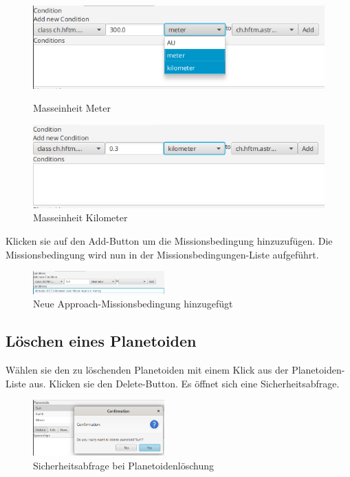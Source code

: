 \begin{figure}[H]
	\centering
	\begin{minipage}[b]{0.45\textwidth}
		\includegraphics[width=\textwidth]{res/conditionunits.png}
		\caption{Masseinheit Meter}
	\end{minipage}
	\hfill
	\begin{minipage}[b]{0.45\textwidth}
		\includegraphics[width=\textwidth]{res/conditionunits2.png}
		\caption{Masseinheit Kilometer}
	\end{minipage}
\end{figure}

Klicken sie auf den Add-Button um die Missionsbedingung hinzuzufügen.
Die Missionsbedingung wird nun in der Missionsbedingungen-Liste aufgeführt.

\begin{figure}[H]
	\centering
	\includegraphics[width=0.45\textwidth]{res/conditionadded.png}
	\caption{Neue Approach-Missionsbedingung hinzugefügt}
\end{figure}

\subsection{Löschen eines Planetoiden}
Wählen sie den zu löschenden Planetoiden mit einem Klick aus der Planetoiden-Liste aus.
Klicken sie den Delete-Button.
Es öffnet sich eine Sicherheitsabfrage.

\begin{figure}[H]
	\centering
	\includegraphics[width=0.45\textwidth]{res/loeschenplanetoid.png}
	\caption{Sicherheitsabfrage bei Planetoidenlöschung}
\end{figure}

